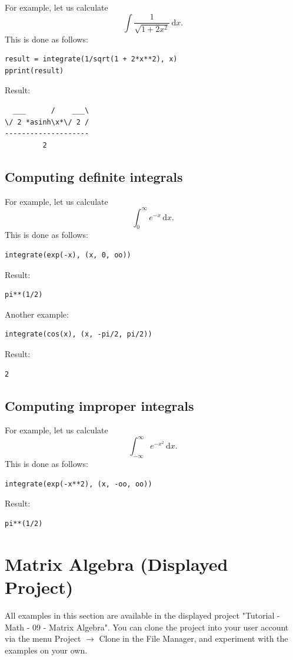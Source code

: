 \documentclass[article,A4,12pt]{llncs}
\def\x{\mathbf{x}}
\begin{document}
For example, let us calculate 
$$
\int \frac{1}{\sqrt{1 + 2x^2}}\, \mbox{d} x.
$$
This is done as follows:
\begin{verbatim}
result = integrate(1/sqrt(1 + 2*x**2), x)
pprint(result)
\end{verbatim}
Result:
\begin{verbatim}
  ___      /    ___\
\/ 2 *asinh\x*\/ 2 /
--------------------
         2      
\end{verbatim}

\subsection{Computing definite integrals}

For example, let us calculate
$$
\int_0^{\infty} e^{-x}\, \mbox{d} x.
$$
This is done as follows:
\begin{verbatim}
integrate(exp(-x), (x, 0, oo))
\end{verbatim}
Result:
\begin{verbatim}
pi**(1/2)
\end{verbatim}
Another example:
\begin{verbatim}
integrate(cos(x), (x, -pi/2, pi/2))
\end{verbatim}
Result:
\begin{verbatim}
2
\end{verbatim}

\subsection{Computing improper integrals}

For example, let us calculate
$$
\int_{-\infty}^{\infty} e^{-x^2}\, \mbox{d} x.
$$
This is done as follows:
\begin{verbatim}
integrate(exp(-x**2), (x, -oo, oo))
\end{verbatim}
Result:
\begin{verbatim}
pi**(1/2)
\end{verbatim}


\section{Matrix Algebra (Displayed Project)}

All examples in this section are available in the displayed project 
"Tutorial - Math - 09 - Matrix Algebra". You can clone the project into 
your user account via the menu Project $\rightarrow$ Clone in the File 
Manager, and experiment with the examples on your own.
\end{document}

